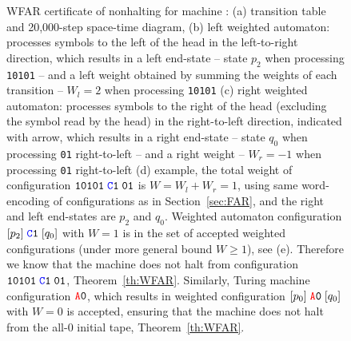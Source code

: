 \begin{figure}[h!]
\begin{minipage}[t]{0.71\textwidth}
{
        }
    \end{minipage}

    \caption{{\small WFAR certificate of nonhalting for machine : (a) transition table and 20,000-step space-time diagram, (b) left weighted automaton: processes symbols to the left of the head in the left-to-right direction, which results in a left end-state -- \eg state $p_2$ when processing \texttt{10101} -- and a left weight obtained by summing the weights of each transition -- \eg $W_l = 2$ when processing \texttt{10101} (c) right weighted automaton: processes symbols to the right of the head (excluding the symbol read by the head) in the right-to-left direction, indicated with arrow, which results in a right end-state -- \eg state $q_0$ when processing \texttt{01} right-to-left -- and a right weight -- \eg $W_r = -1$ when processing \texttt{01} right-to-left (d) example, the total weight of configuration $\texttt{10101}\; \texttt{\stateC}\sone\; \texttt{01}$ is $W=W_l+W_r = 1$, using same word-encoding of configurations as in Section~\ref{sec:FAR}, and the right and left end-states are $p_2$ and $q_0$. Weighted automaton configuration $[p_2]\; \texttt{\stateC}\texttt{1}\; [q_0]$ with $W = 1$ is in the set of accepted weighted configurations (under more general bound $W \geq 1$), see (e). Therefore we know that the machine does not halt from configuration $\texttt{10101}\; \texttt{\stateC}\sone\; \texttt{01}$, Theorem~\ref{th:WFAR}. Similarly, Turing machine configuration $\texttt{\stateA}\texttt{0}$, which results in weighted configuration $[p_0]\;\texttt{\stateA}\texttt{0}\; [q_0]$ with $W=0$ is accepted, ensuring that the machine does not halt from the all-0 initial tape, Theorem~\ref{th:WFAR}.}}\label{fig:WFAR}
\end{figure}


